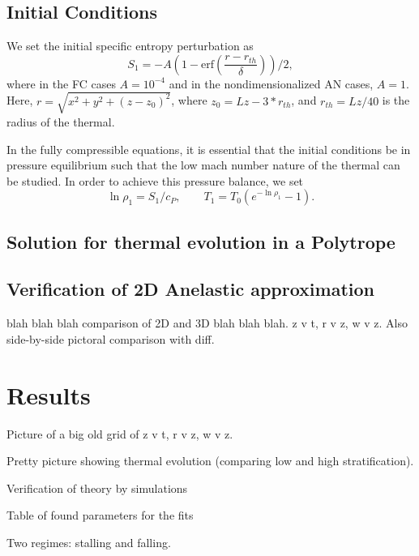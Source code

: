 \documentclass[twocolumn, amsmath, amsfonts, amssymb, trackchanges]{aastex62}
\begin{document}
\subsection{Initial Conditions}
We set the initial specific entropy perturbation as
\begin{equation}
S_1 = - A(1 - \text{erf}\left(\frac{r - r_{th}}{\delta}\right))/2,
\end{equation}
where in the FC cases $A = 10^{-4}$ and in the nondimensionalized AN cases,
$A = 1$. Here, $r = \sqrt{x^2 + y^2 + (z - z_0)^2}$, where $z_0 = Lz - 3*r_{th}$,
and $r_{th} = Lz/40$ is the radius of the thermal.

In the fully compressible equations, it is essential that the initial conditions be in pressure
equilibrium such that the low mach number nature of the thermal can be studied. In order to 
achieve this pressure balance, we set
\begin{equation}
\ln\rho_1 = S_1/c_P, \qquad T_1 = T_0(e^{-\ln\rho_1} - 1).
\end{equation}


\subsection{Solution for thermal evolution in a Polytrope}


\subsection{Verification of 2D Anelastic approximation}
blah blah blah comparison of 2D and 3D blah blah blah. z v t, r v z, w v z. Also side-by-side
pictoral comparison with diff.


\section{Results}
\label{sec:results}
Picture of a big old grid of z v t, r v z, w v z.

Pretty picture showing thermal evolution (comparing low and high stratification).

Verification of theory by simulations

Table of found parameters for the fits

Two regimes: stalling and falling.


\end{document}
